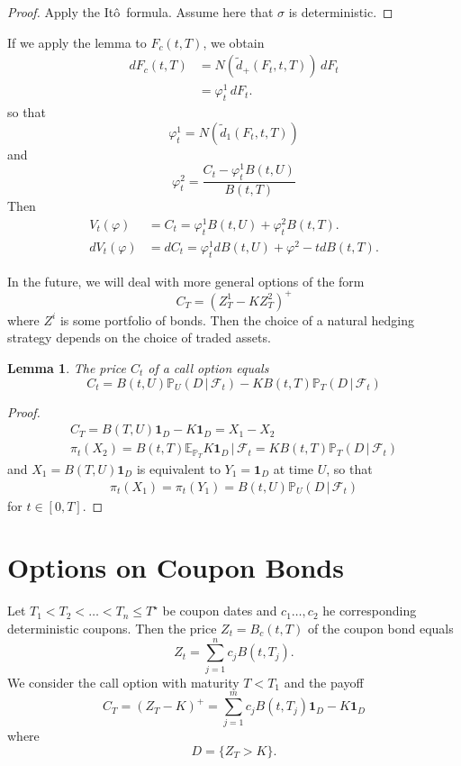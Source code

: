 \documentclass[10pt, oneside, reqno]{amsbook}
\theoremstyle{plain}%
\newtheorem{lem}[thm]{Lemma}
\theoremstyle{definition}
\theoremstyle{remark}
\newcommand{\given}{ \, | \,}
\renewcommand{\phi}{\varphi}
\newcommand{\sigf}{\mathcal{F}}
\newcommand{\E}{\mathbb{E}}
\renewcommand{\P}{\mathbb{P}}
\newcommand{\ito}{It\^o\ }
\numberwithin{equation}{chapter}
\begin{document}
\begin{proof}
    Apply the \ito formula.  Assume here that $\sigma$ is deterministic. 
\end{proof}

 If we apply the lemma to $F_c(t, T)$, we obtain \begin{align*}
    dF_c(t, T) &= N(\tilde d_+(F_t, t, T)) \, dF_t \\
                &= \phi^1_t \, dF_t.
\end{align*} so that \[
    \phi^1_t = N(\tilde d_1(F_t, t, T))
\] and \[
    \phi^2_t = \frac{C_t - \phi^1_t B(t, U)}{B(t, T)}
\] Then \begin{align*}
    V_t(\phi)   &= C_t = \phi^1_tB(t, U) + \phi^2_t B(t, T). \\
    dV_t(\phi)  &= dC_t = \phi^1_t dB(t, U) + \phi^2-t dB(t, T).
\end{align*}

In the future, we will deal with more general options of the form \[
    C_T = (Z^1_T - K Z^2_T)^+
\]  where $Z^i$ is some portfolio of bonds.  Then the choice of a natural hedging strategy depends on the choice of traded assets.  

\begin{lem}
    The price $C_t$ of a call option equals \[
        C_t = B(t, U) \P_U(D \given \sigf_t) - K B(t, T) \P_T(D \given \sigf_t)
    \]
\end{lem}

\begin{proof}
    \begin{align*}
        C_T = B(T, U) \mathbf{1}_D - K \mathbf{1}_D = X_1 - X_2 \\
        \pi_t(X_2) = B(t, T) \E_{\P_T} K \mathbf{1}_D \given \sigf_t = K B(t, T) \P_T (D \given \sigf_t)
    \end{align*} and $X_1 = B(T, U) \mathbf{1}_D$ is equivalent to $Y_1 = \mathbf{1}_D$ at time $U$, so that \begin{align*}
        \pi_t(X_1) = \pi_t(Y_1) = B(t, U) \P_{U}(D \given \sigf_t)
    \end{align*} for $t \in [0, T]$.
\end{proof}

\section{Options on Coupon Bonds} %
\label{sec:options_on_coupon_bonds}
Let $T_1 < T_2 < \dots < T_n \leq T^\star$ be coupon dates and $c_1 \dots, c_2$ he corresponding deterministic coupons.  Then the price $Z_t = B_c(t, T)$ of the coupon bond equals \[
    Z_t = \sum_{j=1}^n c_j B(t, T_j).
\]  We consider the call option with maturity $T < T_1$ and the payoff \[
    C_T = (Z_T - K)^+ = \sum_{j=1}^m c_j B(t, T_j) \mathbf{1}_D - K \mathbf{1}_D
\]   where \[
    D = \{ Z_T > K \}.
\]
\end{document}
